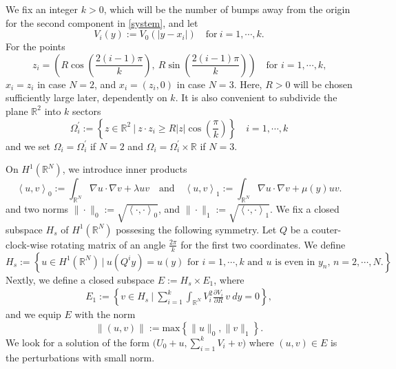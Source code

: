 \documentclass{amsart}
\theoremstyle{definition}
\theoremstyle{remark}
\numberwithin{equation}{section}
\begin{document}
We fix an integer $k>0$, which will be the number of bumps away from the origin for the second component in \ref{system}, and let \[V_{i}(y):=V_{0}(|y-x_i|)\quad\mbox{for}\  i=1,\cdots,k.\] For the points
$$z_i= \left( R \cos\left(\frac{2(i-1)\pi}{k}\right), ~R \sin\left(\frac{2(i-1)\pi}{k}\right)\right) \quad \text{for $i=1,\cdots,k$,}$$
$x_i = z_i$ in case $N=2$, and $x_i = (z_i,0)$ in case $N=3$.  Here, $R>0$ will be chosen sufficiently large later, dependently on $k$. It is also convenient to subdivide the plane $\mathbb{R}^2$ into $k$ sectors
$$\Omega^\prime_i := \left\{z \in \mathbb{R}^2~\Big|~ z\cdot z_i \ge  {R}|z|\cos\left(\frac{\pi}{k}\right)\right\} \quad i=1,\cdots,k$$
and we set $\Omega_i = \Omega^\prime_i$ if $N=2$ and $\Omega_i = \Omega^\prime_i \times \mathbb{R}$ if $N=3$.




On $H^1( \mathbb{R}^N)$, we introduce inner products
$$ \left<u,v\right>_0:= \int_{ \mathbb{R}^N} \nabla u\cdot\nabla v + \lambda uv \quad \text{and} \quad \left<u,v\right>_1:= \int_{ \mathbb{R}^N} \nabla u\cdot\nabla v + \mu(y) uv.$$ and two norms $\|\cdot\|_0:=\sqrt{\left<\cdot,\cdot\right>_0}$, and $\|\cdot\|_1:=\sqrt{\left<\cdot,\cdot\right>_1}$. We fix a closed subspace $H_s$ of $H^1( \mathbb{R}^N)$ possesing the following symmetry. Let $Q$ be a couter-clock-wise rotating matrix of an angle $\frac{2\pi}{k}$ for the first two coordinates. We define 
\begin{equation*}
 H_s:= \left\{ u \in H^1 (\mathbb{R}^N) ~\Big|~ \text{$u(Q^iy) = u(y)$ for $i=1,\cdots,k$ and $u$ is even in $y_n$, $n=2,\cdots,N$.}\right\}
\end{equation*}
Nextly, we define a  closed subspace $E:= H_s \times E_1$, where
\begin{equation}
 \begin{aligned} 
    E_1:= \left\{ v \in H_s ~\Big|~  \sum_{i=1}^k\int_{\mathbb{R}^N}  V_{i}^2 \frac{\partial V_{i}}{\partial R} \,v~dy = 0 \right\},
 \end{aligned}
\end{equation}
 and we equip $E$ with the norm \[\|(u,v)\|:= \mbox{max} \left\{ \| u\|_0, \| v\|_1\right\}.\] We look for a solution of the form $\big(U_0 +u,  {\sum^k_{i=1}} V_{i} + v\big)$ where $(u,v)\in E$ is the perturbations  with small norm.
\end{document}
